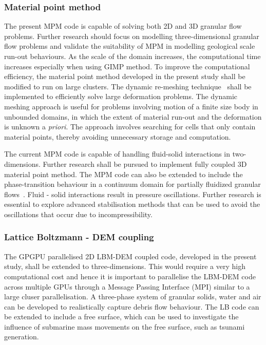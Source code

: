 \subsubsection*{Material point method}

The present MPM code is capable of solving both 2D and 3D granular flow 
problems. Further research should focus on modelling three-dimensional granular 
flow problems and validate the suitability of MPM in modelling geological scale 
run-out behaviours. As the scale of the domain increases, the computational 
time increases especially when using GIMP method. To improve the computational 
efficiency, the material point method developed in the present study shall be 
modified to run on large clusters. The dynamic re-meshing 
technique~\citep{Shin2010a} shall be implemented to efficiently solve 
large deformation problems. The dynamic meshing approach is useful for problems 
involving motion of a finite size body in unbounded domains, in which the 
extent of material run-out and the deformation is unknown a \textit{priori}. 
The approach involves searching for cells that only contain material points, 
thereby avoiding unnecessary storage and computation. 

The current MPM code is capable of handling fluid-solid interactions in 
two-dimensions. Further research shall be pursued to implement fully coupled 3D 
material point method. The MPM code can also be extended to include the 
phase-transition behaviour in a continuum domain for partially fluidized 
granular flows~\citep{Aranson2002, Aranson2001, Volfson2003}. Fluid - solid 
interactions result in pressure oscillations. Further research is essential to 
explore advanced stabilisation methods that can be used to avoid the 
oscillations that occur due to incompressibility.

\subsubsection*{Lattice Boltzmann - DEM coupling}

The GPGPU parallelised 2D LBM-DEM coupled code, developed in the present study, 
shall be extended to 
three-dimensions. This would require a very high computational cost and hence 
it is important to parallelise the LBM-DEM code across multiple GPUs through a 
Message Passing Interface (MPI) similar to a large cluser parallelisation. A 
three-phase system of granular solids, water and air can be developed to 
realistically capture debris flow behaviour. The LB code can be extended to 
include a free surface, which can be used to investigate the influence of 
submarine mass movements on the free surface, such as tsunami generation.

